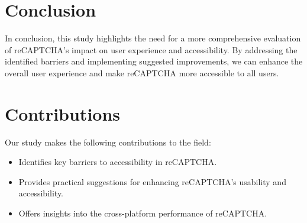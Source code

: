 \documentclass{article}
\begin{document}
\section{Conclusion}
In conclusion, this study highlights the need for a more comprehensive evaluation of reCAPTCHA’s impact on user experience and accessibility. By addressing the identified barriers and implementing suggested improvements, we can enhance the overall user experience and make reCAPTCHA more accessible to all users.

\section{Contributions}
Our study makes the following contributions to the field:
\begin{itemize}
    \item Identifies key barriers to accessibility in reCAPTCHA.
    \item Provides practical suggestions for enhancing reCAPTCHA’s usability and accessibility.
    \item Offers insights into the cross-platform performance of reCAPTCHA.
\end{itemize}



\end{document}
